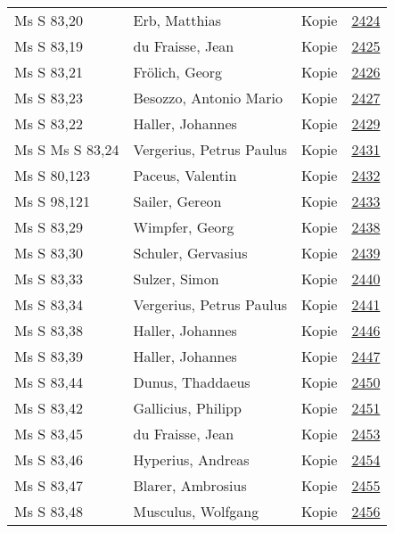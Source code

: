 \documentclass[10pt,a4paper,landscape]{report}
\begin{document}
\begin{longtable}{p{16cm}p{4cm}lr}
Ms S 83,20	&	Erb, Matthias	&	Kopie	&	\href{http://130.60.24.72/assignment/2424}{2424}\\
Ms S 83,19	&	du Fraisse, Jean	&	Kopie	&	\href{http://130.60.24.72/assignment/2425}{2425}\\
Ms S 83,21	&	Frölich, Georg	&	Kopie	&	\href{http://130.60.24.72/assignment/2426}{2426}\\
Ms S 83,23	&	Besozzo, Antonio Mario	&	Kopie	&	\href{http://130.60.24.72/assignment/2427}{2427}\\
Ms S 83,22	&	Haller, Johannes	&	Kopie	&	\href{http://130.60.24.72/assignment/2429}{2429}\\
Ms S Ms S 83,24	&	Vergerius, Petrus Paulus	&	Kopie	&	\href{http://130.60.24.72/assignment/2431}{2431}\\
Ms S 80,123	&	Paceus, Valentin	&	Kopie	&	\href{http://130.60.24.72/assignment/2432}{2432}\\
Ms S 98,121	&	Sailer, Gereon	&	Kopie	&	\href{http://130.60.24.72/assignment/2433}{2433}\\
Ms S 83,29	&	Wimpfer, Georg	&	Kopie	&	\href{http://130.60.24.72/assignment/2438}{2438}\\
Ms S 83,30	&	Schuler, Gervasius	&	Kopie	&	\href{http://130.60.24.72/assignment/2439}{2439}\\
Ms S 83,33	&	Sulzer, Simon	&	Kopie	&	\href{http://130.60.24.72/assignment/2440}{2440}\\
Ms S 83,34	&	Vergerius, Petrus Paulus	&	Kopie	&	\href{http://130.60.24.72/assignment/2441}{2441}\\
Ms S 83,38	&	Haller, Johannes	&	Kopie	&	\href{http://130.60.24.72/assignment/2446}{2446}\\
Ms S 83,39	&	Haller, Johannes	&	Kopie	&	\href{http://130.60.24.72/assignment/2447}{2447}\\
Ms S 83,44	&	Dunus, Thaddaeus	&	Kopie	&	\href{http://130.60.24.72/assignment/2450}{2450}\\
Ms S 83,42	&	Gallicius, Philipp	&	Kopie	&	\href{http://130.60.24.72/assignment/2451}{2451}\\
Ms S 83,45	&	du Fraisse, Jean	&	Kopie	&	\href{http://130.60.24.72/assignment/2453}{2453}\\
Ms S 83,46	&	Hyperius, Andreas	&	Kopie	&	\href{http://130.60.24.72/assignment/2454}{2454}\\
Ms S 83,47	&	Blarer, Ambrosius	&	Kopie	&	\href{http://130.60.24.72/assignment/2455}{2455}\\
Ms S 83,48	&	Musculus, Wolfgang	&	Kopie	&	\href{http://130.60.24.72/assignment/2456}{2456}\\

\end{longtable}
\end{document}

